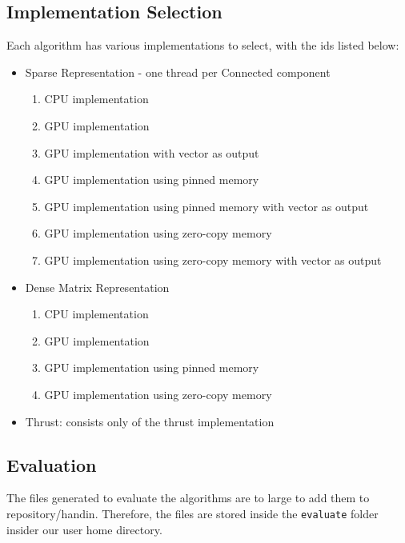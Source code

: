 \documentclass[letta4 paper]{article}
\numberwithin{equation}{section}
\newcommand{\0}{\mathbf{0}}
\begin{document}
\subsection{Implementation Selection}

Each algorithm has various implementations to select, with the ids listed below:
\begin{itemize}
    \item Sparse Representation - one thread per Connected component
        \begin{enumerate}[label=\arabic*]\addtocounter{enumi}{-1}
            \item CPU implementation
            \item GPU implementation 
            \item GPU implementation with vector as output
            \item GPU implementation using pinned memory
            \item GPU implementation using pinned memory with vector as output
            \item GPU implementation using zero-copy memory
            \item GPU implementation using zero-copy memory with vector as output
        \end{enumerate}
    \item Dense Matrix Representation
        \begin{enumerate}[label=\arabic*]\addtocounter{enumi}{-1}
            \item CPU implementation
            \item GPU implementation
            \item GPU implementation using pinned memory
            \item GPU implementation using zero-copy memory
        \end{enumerate}
    \item Thrust: consists only of the thrust implementation
\end{itemize}

\subsection{Evaluation}

The files generated to evaluate the algorithms are to large to add them to repository/handin. Therefore, the files are stored inside the \texttt{evaluate} folder insider our user home directory.
\end{document}
